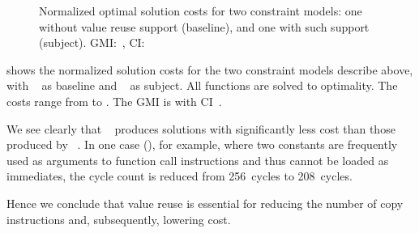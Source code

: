 

\begin{figure}
  \centering%
  \maxsizebox{\textwidth}{!}{%
    \trimBarchartPlot{%
    }%
  }

  \caption[Plot for evaluating value reuse's impact on code quality]%
          {%
            Normalized optimal solution costs for two constraint models: one
            without value reuse support (baseline), and one with such support
            (subject).
            GMI:~\printGMI{%
              \AltValuesVsWithoutCyclesSpeedupCyclesRegularSpeedupGmean%
            },
            CI:~\printGMICI{%
              \AltValuesVsWithoutCyclesSpeedupCyclesRegularSpeedupCiMin%
            }{%
              \AltValuesVsWithoutCyclesSpeedupCyclesRegularSpeedupCiMax%
            }%
          }
\end{figure}

 shows the normalized
\gls{solution} costs for the two \glspl{constraint model} describe above, with
~ as \gls{baseline} and
~ as \gls{subject}.
%
All \glspl{function} are solved to optimality.
%
The costs range from
\printMinCycles{%
  \AltValuesVsWithoutCyclesSpeedupCyclesAvgMin,
  \AltValuesVsWithoutCyclesSpeedupBaselineCyclesAvgMin
} to
\printMaxCycles{%
  \AltValuesVsWithoutCyclesSpeedupCyclesAvgMax,
  \AltValuesVsWithoutCyclesSpeedupBaselineCyclesAvgMax
}.
%
The \gls{GMI} is \printGMI{%
  \AltValuesVsWithoutCyclesSpeedupCyclesRegularSpeedupGmean%
} with \gls{CI}~\printGMICI{%
  \AltValuesVsWithoutCyclesSpeedupCyclesRegularSpeedupCiMin%
}{%
  \AltValuesVsWithoutCyclesSpeedupCyclesRegularSpeedupCiMax%
}.

We see clearly that ~
produces \glspl{solution} with significantly less cost than those produced by
~.
%
In one case (), for example, where two constants are
frequently used as arguments to \gls{function} call \glspl{instruction} and thus
cannot be loaded as immediates, the cycle count is reduced from \num{256}~cycles
to \num{208}~cycles.

Hence we conclude that \gls{value reuse} is essential for reducing the number of
copy \glspl{instruction} and, subsequently, lowering cost.


